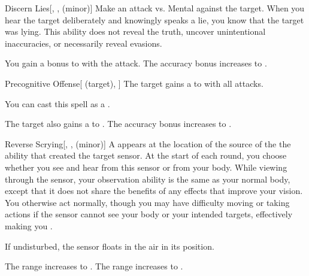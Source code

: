 \lowercase{\hypertarget{spell:Discern Lies}{}}\label{spell:Discern Lies}
\begin{freeability}[Rank 3]{\hypertarget{spell:Discern Lies}{Discern Lies}}[, ,  (minor)]
Make an attack vs. Mental against the target.
\hit When you hear the target deliberately and knowingly speaks a lie, you know that the target was lying.
This ability does not reveal the truth, uncover unintentional inaccuracies, or necessarily reveal evasions.

\rankline
{} You gain a  bonus to  with the attack.
 The accuracy bonus increases to .
\end{freeability}
\vspace{0.25em}



\lowercase{\hypertarget{spell:Precognitive Offense}{}}\label{spell:Precognitive Offense}
\begin{attuneability}[Rank 3]{\hypertarget{spell:Precognitive Offense}{Precognitive Offense}}[ (target), ]
The target gains a   to  with all attacks.

You can cast this spell as a .

\rankline
{} The target also gains a   to .
 The accuracy bonus increases to .
\end{attuneability}
\vspace{0.25em}



\lowercase{\hypertarget{spell:Reverse Scrying}{}}\label{spell:Reverse Scrying}
\begin{freeability}[Rank 3]{\hypertarget{spell:Reverse Scrying}{Reverse Scrying}}[, ,  (minor)]
A  appears at the location of the source of the the ability that created the target sensor.
At the start of each round, you choose whether you see and hear from this sensor or from your body.
While viewing through the sensor, your observation ability is the same as your normal body, except that it does not share the benefits of any  effects that improve your vision.
You otherwise act normally, though you may have difficulty moving or taking actions if the sensor cannot see your body or your intended targets, effectively making you \blinded.

If undisturbed, the sensor floats in the air in its position.

\rankline
{} The range increases to \rnglong.
 The range increases to \rngext.
\end{freeability}
\vspace{0.25em}



